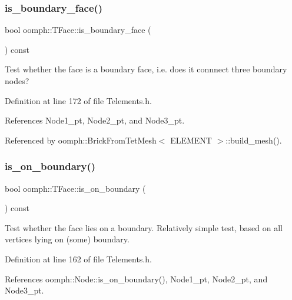 \subsubsection{\texorpdfstring{is\+\_\+boundary\+\_\+face()}{is\_boundary\_face()}}
{\footnotesize\ttfamily bool oomph\+::\+T\+Face\+::is\+\_\+boundary\+\_\+face (\begin{DoxyParamCaption}{ }\end{DoxyParamCaption}) const\hspace{0.3cm}{\ttfamily [inline]}}



Test whether the face is a boundary face, i.\+e. does it connnect three boundary nodes? 



Definition at line 172 of file Telements.\+h.



References Node1\+\_\+pt, Node2\+\_\+pt, and Node3\+\_\+pt.



Referenced by oomph\+::\+Brick\+From\+Tet\+Mesh$<$ E\+L\+E\+M\+E\+N\+T $>$\+::build\+\_\+mesh().

\mbox{\label{classoomph_1_1TFace_a12c3aa641fc52d32d779de6c10a343be}} 
\subsubsection{\texorpdfstring{is\+\_\+on\+\_\+boundary()}{is\_on\_boundary()}}
{\footnotesize\ttfamily bool oomph\+::\+T\+Face\+::is\+\_\+on\+\_\+boundary (\begin{DoxyParamCaption}{ }\end{DoxyParamCaption}) const\hspace{0.3cm}{\ttfamily [inline]}}



Test whether the face lies on a boundary. Relatively simple test, based on all vertices lying on (some) boundary. 



Definition at line 162 of file Telements.\+h.



References oomph\+::\+Node\+::is\+\_\+on\+\_\+boundary(), Node1\+\_\+pt, Node2\+\_\+pt, and Node3\+\_\+pt.

